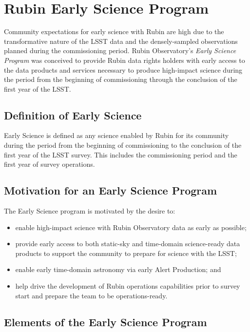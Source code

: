 \section{Rubin Early Science Program}

Community expectations for early science with Rubin are high due to the transformative nature of the LSST data and the densely-sampled observations planned during the commissioning period.
Rubin Observatory's \emph{Early Science Program} was conceived to provide Rubin data rights holders with early access to the data products and services necessary to produce high-impact science during the period from the beginning of commissioning through the conclusion of the first year of the LSST.

\subsection{Definition of Early Science}
\label{ssec:defn}
Early Science is defined as any science enabled by Rubin for its community during the period from the beginning of commissioning to the conclusion of the first year of the LSST survey.
This includes the commissioning period and the first year of survey operations.

\subsection{Motivation for an Early Science Program}  \label{ssec:motivation}

The Early Science program is motivated by the desire to:
\begin{itemize}
\item enable high-impact science with Rubin Observatory data as early as possible;
\item provide early access to both static-sky and time-domain science-ready data products to support the community to prepare for science with the LSST;
\item enable early time-domain astronomy via early Alert Production; and 
\item help drive the development of Rubin operations capabilities prior to survey start and prepare the team to be operations-ready.
\end{itemize}

\subsection{Elements of the Early Science Program}

